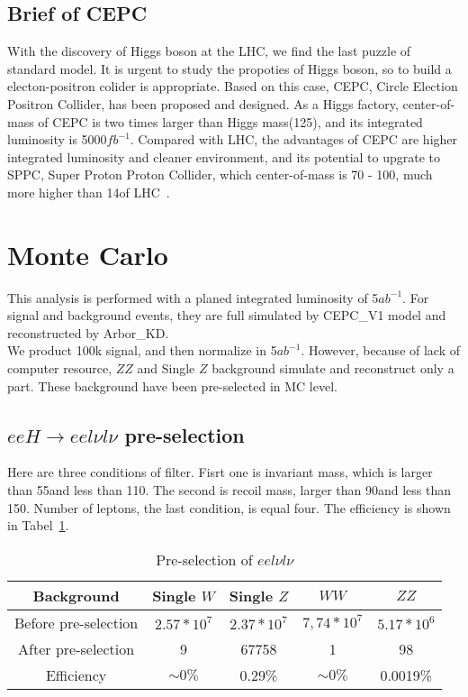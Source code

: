 \documentclass[11pt,a4paper]{cepcnote}
\begin{document}
\subsection{Brief of CEPC}
With the discovery of Higgs boson at the LHC, we find the last puzzle of standard model.
It is urgent to study the propoties of Higgs boson, so to build a electon-positron colider is appropriate.
Based on this case, CEPC, Circle Election Positron Collider, has been proposed and designed. 
As a Higgs factory, center-of-mass of CEPC is two times larger than Higgs mass(125\gev), 
and its integrated luminosity is 5000$fb^{-1}$.
Compared with LHC, the advantages of CEPC are higher integrated luminosity and cleaner environment, 
and its potential to upgrate to SPPC, Super Proton Proton Collider, which center-of-mass is 70 - 100\tev,
much more higher than 14\tev of LHC~\cite{precdr}.
\\

\section{Monte Carlo}
This analysis is performed with a planed integrated luminosity of 5$ab^{-1}$. For signal
and background events, they are full simulated by CEPC\_V1 model and reconstructed by Arbor\_KD. \\
We product 100k signal, and then normalize in 5$ab^{-1}$.
However, because of lack of computer resource, $ZZ$ and Single $Z$ background simulate and reconstruct only a part. 
These background have been pre-selected in MC level. 

\subsection{$eeH\rightarrow eel\nu l\nu$ pre-selection}
Here are three conditions of filter. Fisrt one is invariant mass, which is larger than 55\gev and less than 110\gev.
The second is recoil mass, larger than 90\gev and less than 150\gev.
Number of leptons, the last condition, is equal four. The efficiency is shown in Tabel~\ref{tab:eehfull}.
\begin{table}[H]
  \begin{center}
    \begin{tabular}{ccccc}
      \hline \hline
      \multicolumn{1}{c}{Background}      & \multicolumn{1}{c}{Single $W$}&\multicolumn{1}{c}{Single $Z$}
	  &\multicolumn{1}{c}{$WW$}	&\multicolumn{1}{c}{$ZZ$}\\ 
      \hline
      Before pre-selection& $2.57*10^7$ & $2.37*10^7$	&  $7,74*10^7$	&  $5.17*10^6$\\
      \hline
      After pre-selection &  9 		 & 	67758		&  1			&  98\\
      \hline
      Efficiency         			&$\sim 0\%$ &   0.29\%		& $\sim 0\%$&  0.0019\%\\
      \hline \hline
    \end{tabular}
   \caption[Monte Carlo purities in the single lepton sample]{Pre-selection of $ee l\nu l\nu$}
  \label{tab:eehfull}
 \end{center}
\end{table}
\end{document}
